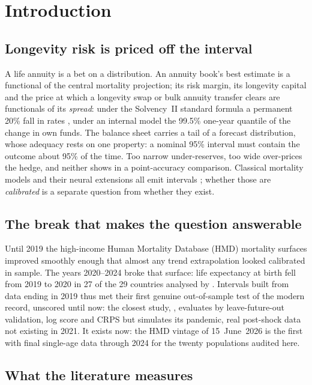 \section{Introduction}
\label{sec:intro}

\subsection{Longevity risk is priced off the interval}

A life annuity is a bet on a distribution. An annuity book's best estimate
is a functional of the central mortality projection; its risk margin, its
longevity capital and the price at which a longevity swap or bulk annuity
transfer clears are functionals of its \emph{spread}: under the
Solvency~II standard formula a permanent 20\% fall in rates
\citep{eiopa2015delegated}, under an internal model the 99.5\% one-year
quantile of the change in own funds. The balance sheet carries a tail
of a forecast distribution, whose adequacy rests on one property: a nominal
95\% interval must contain the outcome about 95\% of the time. Too narrow
under-reserves, too wide over-prices the hedge, and neither shows in a
point-accuracy comparison. Classical mortality models and their neural
extensions all emit intervals
\citep{lee1992modeling,marino2023neural,miyata2022extending,schnurch2022point};
whether those are \emph{calibrated} is a separate question from whether they
exist.

\subsection{The break that makes the question answerable}

Until 2019 the high-income Human Mortality Database (HMD) mortality
surfaces improved smoothly enough that almost any trend
extrapolation looked calibrated in sample. The years 2020--2024 broke that
surface: life expectancy at birth fell from 2019 to 2020 in 27 of the 29
countries analysed by \citet{aburto2022quantifying}. Intervals built from
data ending in 2019 thus met their first genuine out-of-sample test of the
modern record, unscored
until now: the closest study, \citet{barigou2023bayesian}, evaluates by
leave-future-out validation, log score and CRPS but simulates its pandemic,
real post-shock data not existing in 2021. It exists now: the HMD vintage of
15~June~2026 is the first with final single-age data through 2024 for the
twenty populations audited here.

\subsection{What the literature measures}

